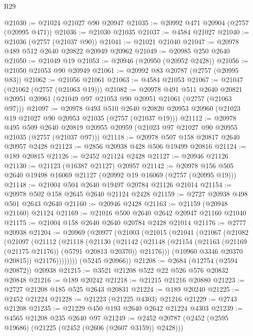 \begin{lexlean}{R29}
\begin{coremodule}
@21030 := @21024 @21027 @90 @20947
@21035 := @20992 @471 @20904 (@2757 (@20995 @471))
@21036 := @21030 @21035
@21037 := @4584 @21027
@21040 := @21036 (@2757 (@21037 @90))
@21041 := @21021 @21040
@21047 := @20978 @489 @512 @2640 @20822 @20949 @20962
@21049 := @20985 @250 @2640
@21050 := @21049 @19
@21053 := @20946 (@20950 (@20952 @2428))
@21056 := @21050 @21053 @90 @20949
@21061 := @20992 @83 @20787 (@2757 (@20995 @83))
@21062 := @21056 @21061
@21063 := @4584 @21053
@21067 := @21047 (@21062 (@2757 (@21063 @19)))
@21082 := @20978
    @491
    @511
    @2640
    @20821
    @20951
    @20961
    (@21049 @97 @21053 @90 @20951 @21061 (@2757 (@21063 @97)))
@21097 := @20978
    @493
    @510
    @2640
    @20820
    @20953
    @20960
    (@21023 @19 @21027 @90 @20953 @21035 (@2757 (@21037 @19)))
@21112 := @20978
    @495
    @509
    @2640
    @20819
    @20955
    @20959
    (@21023 @97 @21027 @90 @20955 @21035 (@2757 (@21037 @97)))
@21118 := @20978 @507 @158 @20817 @2640 @20957 @2428
@21123 := @2856 @20938 @428 @506 @19499 @20816
@21124 := @189 @20815
@21126 := @2452 @21124 @2428
@21127 := @20946 @21126
@21130 := @21123 (@16387 @21127) @20957
@21142 := @20978 @156 @505 @2640 @19498 @16069 @21127 (@20992 @19 @16069 (@2757 (@20995 @19)))
@21148 := @21004 @504 @2640 @19497 @20784 @21126 @21014
@21154 := @20978 @502 @158 @2645 @2640 @21124 @2428
@21159 := @2727 @20938 @498 @501 @2643 @2640
@21160 := @20946 @2428
@21163 := @21159 (@20948 @21160) @21124
@21169 := @21016 @500 @2640 @2642 @20947 @21160 @21040
@21175 := @21004 @158 @2640 @2640 @20784 @2428 @21014
@21176 := @2777 @20938
@21204 := @20969
    (@20977
      (@21003
        (@21015
          (@21041
            (@21067
              (@21082
                (@21097
                  (@21112
                    (@21118
                      (@21130
                        (@21142
                          (@21148
                            (@21154
                              (@21163 (@21169 (@21175 @21176)) (@5791 @20813 @20370))
                              @21176)))
                        (@10960 @3346 @20370 @20815))
                      @21176))))))))
      (@5245 @20966))
@21208 := @2684 (@12754 (@2594 @20872)) @20938
@21215 := @3521 @21208 @522 @22 @526 @576 @20832 @20848
@21216 := @189 @20242
@21218 := @21215 @21216 @20880
@21223 := @2727 @21208 @185 @525 @2643 @20831
@21224 := @189 @20240
@21225 := @2452 @21224
@21228 := @21223 (@21225 @4303) @21216
@21229 := @2743 @21208
@21235 := @21229 @450 @193 @2640 @2642 @21224 @4303
@21239 := @4565 @21208 @235 @2640 @97
@21249 := @2452 @20787 (@2452 (@2595 @19686) (@21225 (@2452 (@2606 (@2607 @3159)) @2428)))

\end{coremodule}
\end{lexlean}

